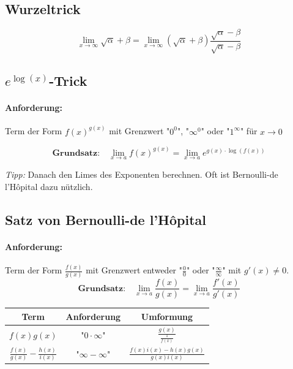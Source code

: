 \documentclass[11pt]{article}
\begin{document}
\subsection{Wurzeltrick}

\begin{equation*}
	\lim_{x\to\infty} \sqrt{\alpha}+\beta = \lim_{x\to\infty}(\sqrt{\alpha}+\beta)\frac{\sqrt{\alpha}-\beta}{\sqrt{\alpha}-\beta}
\end{equation*}

\subsection{$e^{\log(x)}$-Trick}

\paragraph{Anforderung:}Term der Form $f(x)^{g(x)}$ mit Grenzwert "$0^0$", "$\infty^0$" oder "$1^\infty$" f{\"u}r $x \to 0$

\begin{equation*}
	\textbf{Grundsatz:}\quad\lim_{x\to a}f(x)^{g(x)} = \lim_{x\to a}e^{g(x) \cdot \log(f(x))}
\end{equation*}

\emph{Tipp:} Danach den Limes des Exponenten berechnen. Oft ist Bernoulli-de l'H{\^o}pital dazu nützlich.

\subsection{Satz von Bernoulli-de l'H{\^o}pital}

\paragraph{Anforderung:}Term der Form $\frac{f(x)}{g(x)}$ mit Grenzwert entweder "$\frac{0}{0}$" oder "$\frac{\infty}{\infty}$" mit $g'(x) \neq 0$. \\

\begin{equation*}
	\textbf{Grundsatz:}\quad\lim_{x\to a}\frac{f(x)}{g(x)} = \lim_{x\to a}\frac{f'(x)}{g'(x)}
\end{equation*}

\begin{table}[H]
\centering
\begin{tabular}{|c|c|c|}
\hline
\textbf{Term} & \textbf{Anforderung} & \textbf{Umformung} \\ \hline
$f(x)g(x)$              & "$0\cdot\infty$"                     & $\frac{g(x)}{\frac{1}{f(x)}}$          \\ \hline 
$\frac{f(x)}{g(x)} - \frac{h(x)}{i(x)}$ & "$\infty - \infty$"  & $\frac{f(x)i(x) - h(x)g(x)}{g(x)i(x)}$ \\ \hline      
\end{tabular}
\end{table}
\end{document}
